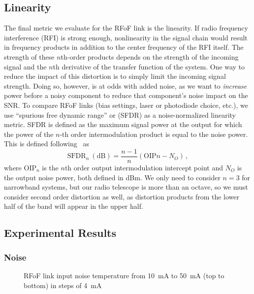 \subsection{Linearity}

The final metric we evaluate for the RFoF link is the linearity.
If radio frequency interference (RFI) is strong enough, nonlinearity in the signal chain would result in frequency products in addition to the center frequency of the RFI itself.
The strength of these $n$th-order products depends on the strength of the incoming signal and the $n$th derivative of the transfer function of the system.
One way to reduce the impact of this distortion is to simply limit the incoming signal strength.
Doing so, however, is at odds with added noise, as we want to \textit{increase} power before a noisy component to reduce that component's noise impact on the SNR.
To compare RFoF links (bias settings, laser or photodiode choice, etc.), we use ``spurious free dynamic range'' or (SFDR) as a noise-normalized linearity metric.
SFDR is defined as the maximum signal power at the output for which the power of the $n$-th order intermodulation product is equal to the noise power.
This is defined following~\cite{pozarMicrowaveEngineering2012} as
\begin{equation}
    \text{SFDR}_n~(\text{dB})= \frac{n-1}{n}(\text{OIP}n - N_O) \,,
    \label{eq:sfdr}
\end{equation}
where $\text{OIP}_n$ is the $n$th order output intermodulation intercept point and $N_O$ is the output noise power, both defined in dBm.
We only need to consider $n=3$ for narrowband systems, but our radio telescope is more than an octave, so we must consider second order distortion as well, as distortion products from the lower half of the band will appear in the upper half.

\subsection{Experimental Results}

\subsubsection{Noise}

\begin{figure}[ht!]
    \centering
    
    \caption[RFoF link input noise temperature]{RFoF link input noise temperature from \qty{10}{\mA} to \qty{50}{\mA} (top to bottom) in steps of \qty{4}{\mA}}
    \label{fig:link_noise_in}
\end{figure}

